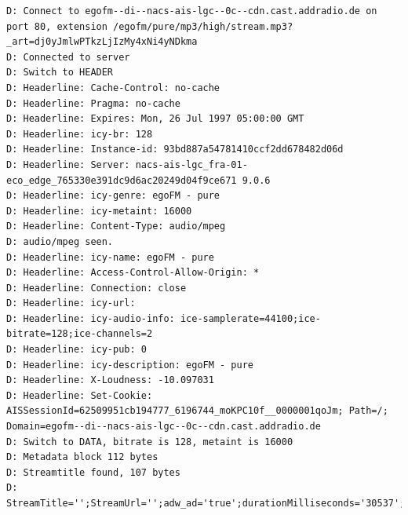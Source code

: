 \documentclass[ngerman,11pt,parskip=half] {scrartcl}
\begin{document}
\begin{lstlisting}
D: Connect to egofm--di--nacs-ais-lgc--0c--cdn.cast.addradio.de on port 80, extension /egofm/pure/mp3/high/stream.mp3?_art=dj0yJmlwPTkzLjIzMy4xNi4yNDkma
D: Connected to server
D: Switch to HEADER
D: Headerline: Cache-Control: no-cache
D: Headerline: Pragma: no-cache
D: Headerline: Expires: Mon, 26 Jul 1997 05:00:00 GMT
D: Headerline: icy-br: 128
D: Headerline: Instance-id: 93bd887a54781410ccf2dd678482d06d
D: Headerline: Server: nacs-ais-lgc_fra-01-eco_edge_765330e391dc9d6ac20249d04f9ce671 9.0.6
D: Headerline: icy-genre: egoFM - pure
D: Headerline: icy-metaint: 16000
D: Headerline: Content-Type: audio/mpeg
D: audio/mpeg seen.
D: Headerline: icy-name: egoFM - pure
D: Headerline: Access-Control-Allow-Origin: *
D: Headerline: Connection: close
D: Headerline: icy-url:  
D: Headerline: icy-audio-info: ice-samplerate=44100;ice-bitrate=128;ice-channels=2
D: Headerline: icy-pub: 0
D: Headerline: icy-description: egoFM - pure
D: Headerline: X-Loudness: -10.097031
D: Headerline: Set-Cookie: AISSessionId=62509951cb194777_6196744_moKPC10f__0000001qoJm; Path=/; Domain=egofm--di--nacs-ais-lgc--0c--cdn.cast.addradio.de
D: Switch to DATA, bitrate is 128, metaint is 16000
D: Metadata block 112 bytes
D: Streamtitle found, 107 bytes
D: StreamTitle='';StreamUrl='';adw_ad='true';durationMilliseconds='30537';adId='7567';insertionType='preroll';

\end{lstlisting}
\end{document}
